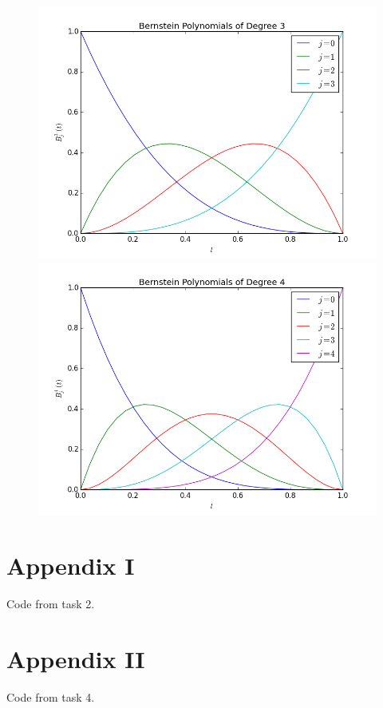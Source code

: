 \documentclass[]{article}
\begin{document}
\begin{figure}[h!]
\includegraphics[scale=0.4]{Bernstein_deg3}
\includegraphics[scale=0.4]{Bernstein_deg4}
\end{figure}

\newpage
\section*{Appendix I}
Code from task 2.


\newpage
\section*{Appendix II}
Code from task 4. 

\end{document}
